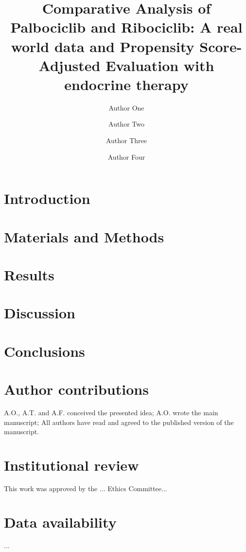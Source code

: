 \documentclass[fleqn,10pt,lineno]{manuscript}
\title{Comparative Analysis of Palbociclib and Ribociclib: A real world data and Propensity Score-Adjusted Evaluation with endocrine therapy}
\author[1]{Author One}
\author[1]{Author Two}
\author[2,3]{Author Three}
\author[1]{Author Four}
\affil[1]{Author one affiliation}
\affil[2]{Author two affiliation}
\affil[3]{Author three affiliation}
\begin{document}
\flushbottom
\maketitle
\thispagestyle{empty}


\section*{Introduction}


\section*{Materials and Methods}


\section*{Results}



 
\section*{Discussion}



\section*{Conclusions}



\section*{Author contributions}
A.O., A.T. and A.F. conceived the presented idea; A.O. wrote the main manuscript; All authors have read and agreed to the published version of the manuscript.

\section*{Institutional review}
This work was approved by the ... Ethics Committee...

\section*{Data availability} 
...
\end{document}
